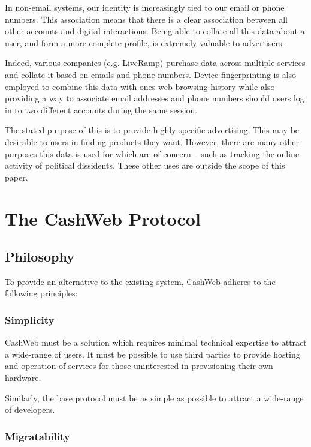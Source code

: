 \documentclass{article}
\begin{document}
In non-email systems, our identity is increasingly tied to our email or phone numbers. This association means that there is a clear association between all other accounts and digital interactions. Being able to collate all this data about a user, and form a more complete profile, is extremely valuable to advertisers.

Indeed, various companies (e.g. LiveRamp) purchase data across multiple services and collate it based on emails and phone numbers. Device fingerprinting is also employed to combine this data with ones web browsing history while also providing a way to associate email addresses and phone numbers should users log in to two different accounts during the same session.

The stated purpose of this is to provide highly-specific advertising. This may be desirable to users in finding products they want. However, there are many other purposes this data is used for which are of concern -- such as tracking the online activity of political dissidents. These other uses are outside the scope of this paper.

\section{The CashWeb Protocol}

\subsection{Philosophy}

To provide an alternative to the existing system, CashWeb adheres to the following principles:

\subsubsection{Simplicity}

CashWeb must be a solution which requires minimal technical expertise to attract a wide-range of users. It must be possible to use third parties to provide hosting and operation of services for those uninterested in provisioning their own hardware.

Similarly, the base protocol must be as simple as possible to attract a wide-range of developers.

\subsubsection{Migratability}
\end{document}
